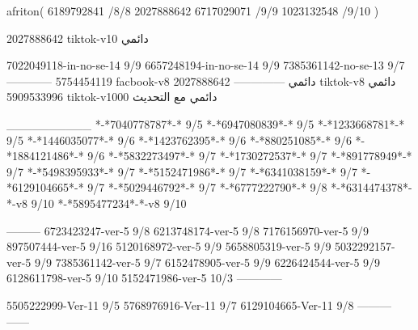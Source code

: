 afriton(
6189792841 /8/8
2027888642
6717029071 /9/9
1023132548 /9/10
)

2027888642 tiktok-v10
دائمي

7022049118-in-no-se-14 9/9
6657248194-in-no-se-14 9/9
7385361142-no-se-13
9/7
------------
5754454119 facbook-v8
دائمي
--------------
2027888642 tiktok-v8
دائمي
5909533996 tiktok-v1000
دائمي مع التحديث

__________
*-*7040778787*-* 9/5
*-*6947080839*-* 9/5
*-*1233668781*-* 9/5
*-*1446035077*-* 9/6
*-*1423762395*-* 9/6
*-*880251085*-* 9/6
*-*1884121486*-* 9/6
*-*5832273497*-* 9/7
*-*1730272537*-* 9/7
*-*891778949*-* 9/7
*-*5498395933*-* 9/7
*-*5152471986*-* 9/7
*-*6341038159*-* 9/7
*-*6129104665*-* 9/7
*-*5029446792*-* 9/7
*-*6777222790*-* 9/8
*-*6314474378*-*-v8 9/10
*-*5895477234*-*-v8 9/10

---------
6723423247-ver-5 9/8
6213748174-ver-5 9/8
7176156970-ver-5 9/9
897507444-ver-5 9/16
5120168972-ver-5 9/9
5658805319-ver-5 9/9
5032292157-ver-5 9/9
7385361142-ver-5 9/7
6152478905-ver-5 9/9
6226424544-ver-5 9/9
6128611798-ver-5 9/10
5152471986-ver-5 10/3
------------

5505222999-Ver-11
9/5
5768976916-Ver-11
9/7
6129104665-Ver-11
9/8
---------
------
